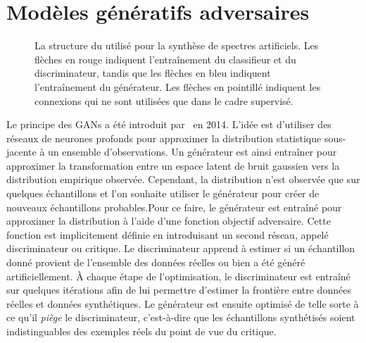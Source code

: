 \section{Modèles génératifs adversaires}

\begin{figure}
		\resizebox{\textwidth}{!}{}
    \caption[La structure du  utilisé pour la synthèse de spectres artificiels.]{La structure du  utilisé pour la synthèse de spectres artificiels. Les flèches en \textcolor{BrickRed}{rouge} indiquent l'entraînement du classifieur et du discriminateur, tandis que les flèches en \textcolor{NavyBlue}{bleu} indiquent l'entraînement du générateur. Les flèches en pointillé indiquent les connexions qui ne sont utilisées que dans le cadre supervisé.}
    \label{fig:gan}
\end{figure}

Le principe des \glspl{GAN} a été introduit par~\citet{goodfellow_generative_2014} en 2014. L'idée est d'utiliser des réseaux de neurones profonds pour approximer la distribution statistique sous-jacente à un ensemble d'observations. Un générateur est ainsi entraîner pour approximer la transformation entre un espace latent de bruit gaussien vers la distribution empirique observée. Cependant, la distribution n'est observée que sur quelques échantillons et l'on souhaite utiliser le générateur pour créer de nouveaux échantillons probables.Pour ce faire, le générateur est entraîné pour approximer la distribution à l'aide d'une fonction objectif adversaire. Cette fonction est implicitement définie en introduisant un second réseau, appelé discriminateur ou critique. Le discriminateur apprend à estimer si un échantillon donné provient de l'ensemble des données réelles ou bien a été généré artificiellement. À chaque étape de l'optimisation, le discriminateur est entraîné sur quelques itérations afin de lui permettre d'estimer la frontière entre données réelles et données synthétiques. Le générateur est ensuite optimisé de telle sorte à ce qu'il \emph{piège} le discriminateur, c'est-à-dire que les échantillons synthétisés soient indistinguables des exemples réels du point de vue du critique.

